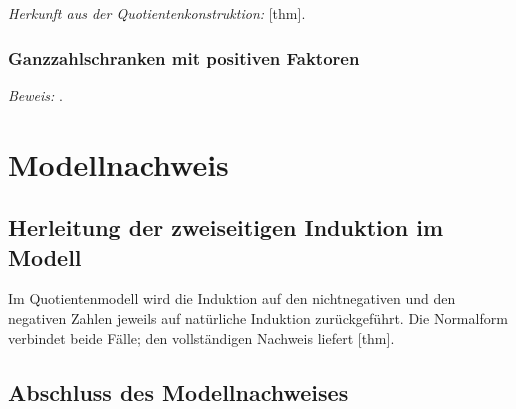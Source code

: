 \documentclass[main.tex]{subfiles}
\begin{document}


\par\noindent\emph{Herkunft aus der Quotientenkonstruktion:}
[thm].\par

\subsection{Ganzzahlschranken mit positiven Faktoren}



\par\noindent\emph{Beweis:} .\par


\chapter{Modellnachweis}

\section{Herleitung der zweiseitigen Induktion im Modell}

Im Quotientenmodell wird die Induktion auf den nichtnegativen und den
negativen Zahlen jeweils auf natürliche Induktion zurückgeführt.
Die Normalform verbindet beide Fälle; den vollständigen Nachweis liefert
[thm].



\section{Abschluss des Modellnachweises}
\end{document}
